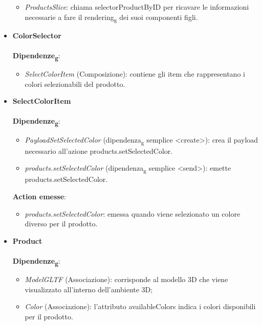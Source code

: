 \begin{itemize}
\begin{itemize}
			\item \textit{ProductsSlice}: chiama selectorProductByID per ricavare le informazioni necessarie a fare il rendering\textsubscript{g}
			dei suoi componenti figli.
		\end{itemize}
		\item \textbf{ColorSelector}
		\\\\
		\textbf{Dipendenze\textsubscript{g}}:
		\begin{itemize}
			\item \textit{SelectColorItem} (Composizione): contiene gli item che rappresentano i colori selezionabili del prodotto.
		\end{itemize}
		\item \textbf{SelectColorItem}
		\\\\
		\textbf{Dipendenze\textsubscript{g}}:
		\begin{itemize}
			\item \textit{PayloadSetSelectedColor} (dipendenza\textsubscript{g} semplice \textless create\textgreater): crea il payload necessario all'azione products.setSelectedColor.
			\item \textit{products.setSelectedColor} (dipendenza\textsubscript{g} semplice \textless send\textgreater): emette products.setSelectedColor.
		\end{itemize}
		\textbf{Action emesse}:
		\begin{itemize}
			\item \textit{products.setSelectedColor}: emessa quando viene selezionato un colore diverso per il prodotto.
		\end{itemize}
		\item \textbf{Product}
		\\\\
		\textbf{Dipendenze\textsubscript{g}}:
		\begin{itemize}
			\item \textit{ModelGLTF} (Associazione): corrisponde al modello 3D che viene visualizzato all'interno dell'ambiente 3D;
			\item \textit{Color} (Associazione): l'attributo availableColors indica i colori disponibili per il prodotto.
		\end{itemize}
\end{itemize}
